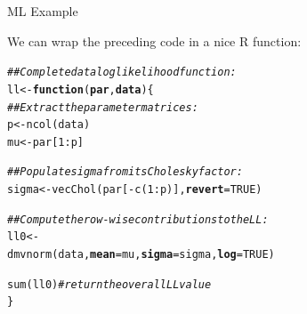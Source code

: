 \documentclass{beamer}\usepackage[]{graphicx}\usepackage[]{color}
\makeatletter
\newcommand{\hlnum}[1]{\textcolor[rgb]{0.69,0.494,0}{#1}}%
\newcommand{\hlcom}[1]{\textcolor[rgb]{0.514,0.506,0.514}{\textit{#1}}}%
\newcommand{\hlopt}[1]{\textcolor[rgb]{0,0,0}{#1}}%
\newcommand{\hlstd}[1]{\textcolor[rgb]{0,0,0}{#1}}%
\newcommand{\hlkwa}[1]{\textcolor[rgb]{0,0,0}{\textbf{#1}}}%
\newcommand{\hlkwb}[1]{\textcolor[rgb]{0,0.341,0.682}{#1}}%
\newcommand{\hlkwc}[1]{\textcolor[rgb]{0,0,0}{\textbf{#1}}}%
\newcommand{\hlkwd}[1]{\textcolor[rgb]{0.004,0.004,0.506}{#1}}%
\newenvironment{kframe}{%
 \def\at@end@of@kframe{}%
 \ifinner\ifhmode%
  \def\at@end@of@kframe{\end{minipage}}%
  \begin{minipage}{\columnwidth}%
 \fi\fi%
 \def\FrameCommand##1{\hskip\@totalleftmargin \hskip-\fboxsep
 \colorbox{shadecolor}{##1}\hskip-\fboxsep
     \hskip-\linewidth \hskip-\@totalleftmargin \hskip\columnwidth}%
 \MakeFramed {\advance\hsize-\width
   \@totalleftmargin\z@ \linewidth\hsize
   \@setminipage}}%
 {\par\unskip\endMakeFramed%
 \at@end@of@kframe}
\newenvironment{knitrout}{}{} %
\makeatother
\begin{document}

\begin{frame}[fragile]{ML Example}

  We can wrap the preceding code in a nice \textsf{R} function:

\begin{knitrout}\footnotesize
{}\color{fgcolor}\begin{kframe}
\begin{alltt}
\hlcom{## Complete data loglikelihood function:}
\hlstd{ll} \hlkwb{<-} \hlkwa{function}\hlstd{(}\hlkwc{par}\hlstd{,} \hlkwc{data}\hlstd{) \{}
    \hlcom{## Extract the parameter matrices:}
    \hlstd{p}  \hlkwb{<-} \hlkwd{ncol}\hlstd{(data)}
    \hlstd{mu} \hlkwb{<-} \hlstd{par[}\hlnum{1} \hlopt{:} \hlstd{p]}

    \hlcom{## Populate sigma from its Cholesky factor:}
    \hlstd{sigma} \hlkwb{<-}\hlkwd{vecChol}\hlstd{(par[}\hlopt{-}\hlkwd{c}\hlstd{(}\hlnum{1} \hlopt{:} \hlstd{p)],} \hlkwc{revert} \hlstd{=} \hlnum{TRUE}\hlstd{)}

    \hlcom{## Compute the row-wise contributions to the LL:}
    \hlstd{ll0} \hlkwb{<-}
        \hlkwd{dmvnorm}\hlstd{(data,} \hlkwc{mean} \hlstd{= mu,} \hlkwc{sigma} \hlstd{= sigma,} \hlkwc{log} \hlstd{=} \hlnum{TRUE}\hlstd{)}

    \hlkwd{sum}\hlstd{(ll0)}\hlcom{# return the overall LL value}
\hlstd{\}}
\end{alltt}
\end{kframe}
\end{knitrout}

\end{frame}

\end{document}
